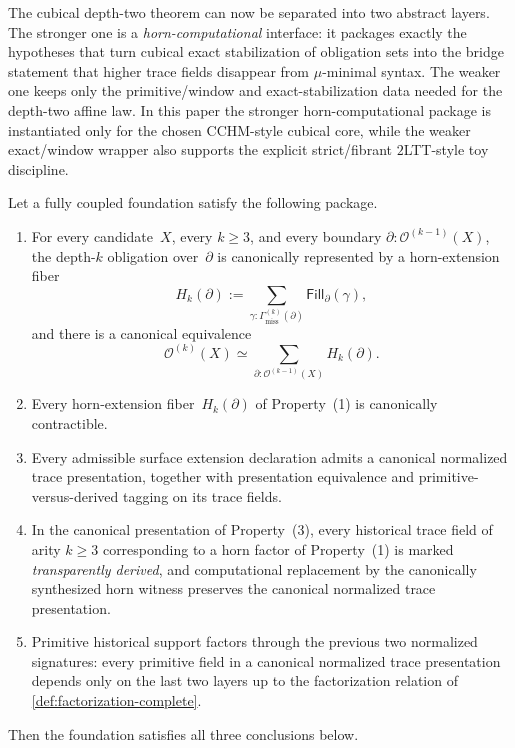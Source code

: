 \documentclass{lmcs}
\newcommand{\Ocal}{\mathcal{O}}
\begin{document}
The cubical depth-two theorem can now be separated into two abstract layers. The stronger one is a \emph{horn-computational} interface: it packages exactly the hypotheses that turn cubical exact stabilization of obligation sets into the bridge statement that higher trace fields disappear from $\mu$-minimal syntax. The weaker one keeps only the primitive/window and exact-stabilization data needed for the depth-two affine law. In this paper the stronger horn-computational package is instantiated only for the chosen CCHM-style cubical core, while the weaker exact/window wrapper also supports the explicit strict/fibrant $2$LTT-style toy discipline.

\begin{thm}
\label{thm:horn-interface}
Let a fully coupled foundation satisfy the following package.
\begin{enumerate}
  \item For every candidate~$X$, every $k \geq 3$, and every boundary $\partial : \Ocal^{(k-1)}(X)$, the depth-$k$ obligation over~$\partial$ is canonically represented by a horn-extension fiber
  \[
    H_k(\partial)
    :=
    \sum_{\gamma : \Gamma^{(k)}_{\mathrm{miss}}(\partial)}
    \mathsf{Fill}_{\partial}(\gamma),
  \]
  and there is a canonical equivalence
  \[
    \Ocal^{(k)}(X)
    \simeq
    \sum_{\partial : \Ocal^{(k-1)}(X)} H_k(\partial).
  \]
  \item Every horn-extension fiber~$H_k(\partial)$ of Property~(1) is canonically contractible.
  \item Every admissible surface extension declaration admits a canonical normalized trace presentation, together with presentation equivalence and primitive-versus-derived tagging on its trace fields.
  \item In the canonical presentation of Property~(3), every historical trace field of arity $k \geq 3$ corresponding to a horn factor of Property~(1) is marked \emph{transparently derived}, and computational replacement by the canonically synthesized horn witness preserves the canonical normalized trace presentation.
  \item Primitive historical support factors through the previous two normalized signatures: every primitive field in a canonical normalized trace presentation depends only on the last two layers up to the factorization relation of \autoref{def:factorization-complete}.
\end{enumerate}
Then the foundation satisfies all three conclusions below.

\end{thm}
\end{document}
